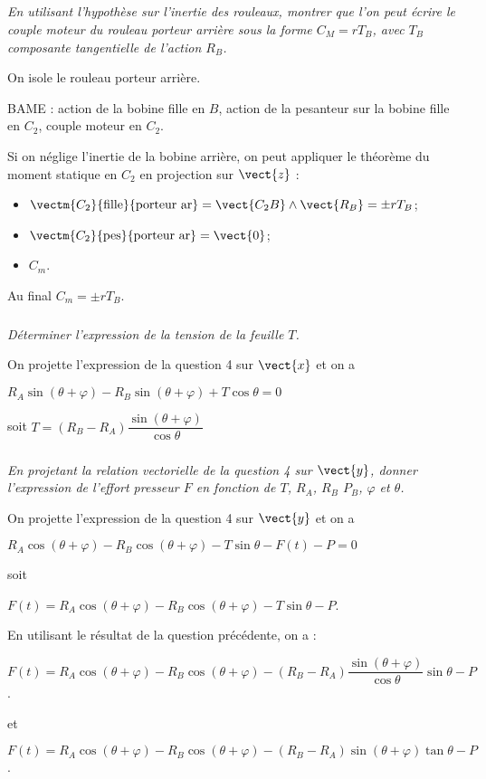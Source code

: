\subparagraph{}
\textit{En utilisant l'hypothèse sur l'inertie des rouleaux, montrer que l'on peut écrire le couple moteur du rouleau porteur arrière sous la forme $C_M=rT_B$, avec $T_B$ composante tangentielle de l'action $R_B$.}
\ifprof
\begin{corrige}
On isole le rouleau porteur arrière.

BAME : action de la bobine fille en $B$, action de la pesanteur sur la bobine fille en $C_2$, couple moteur en $C_2$. 

Si on néglige l'inertie de la bobine arrière, on peut appliquer le théorème du moment statique en $C_2$ en projection sur $\vect{z}$ :
\begin{itemize}
\item $\vectm{C_2}{\text{fille}}{\text{porteur ar}} = \vect{C_2 B} \wedge \vect{R_B} = \pm r T_B$; 
\item $\vectm{C_2}{\text{pes}}{\text{porteur ar}} = \vect{0}$; 
\item $C_m$.
\end{itemize}
Au final $C_m = \pm r T_B$.

\end{corrige}
\else
\fi


\subparagraph{}
\textit{Déterminer l'expression de la tension de la feuille $T$.}
\ifprof
\begin{corrige}
On projette l'expression de la question 4 sur $\vect{x}$ et on a 

$R_A \sin \left(\theta+\varphi\right) - R_B\sin \left(\theta+\varphi\right) + T \cos\theta = 0$

soit
$T =\left(R_B  -R_A\right) \dfrac{\sin \left(\theta+\varphi\right)}{\cos\theta } $
\end{corrige}
\else
\fi


\subparagraph{}
\textit{En projetant la relation vectorielle de la question 4 sur $\vect{y}$, donner l'expression de l'effort presseur $F$ en fonction de $T$, $R_A$, $R_B$ $P_B$, $\varphi$ et $\theta$.}
\ifprof
\begin{corrige}
On projette l'expression de la question 4 sur $\vect{y}$ et on a 

\noindent $R_A \cos \left(\theta+\varphi\right) - R_B\cos \left(\theta+\varphi\right) - T \sin\theta -F(t)-P= 0$ 

soit

$F(t)=R_A \cos \left(\theta+\varphi\right) - R_B\cos \left(\theta+\varphi\right) - T \sin\theta -P$.

En utilisant le résultat de la question précédente, on a : 

$F(t)=R_A \cos \left(\theta+\varphi\right) - R_B\cos \left(\theta+\varphi\right) - \left(R_B  -R_A\right) \dfrac{\sin \left(\theta+\varphi\right)}{\cos\theta } \sin\theta -P$.

et


$F(t)=R_A \cos \left(\theta+\varphi\right) - R_B\cos \left(\theta+\varphi\right) - \left(R_B  -R_A\right)\sin \left(\theta+\varphi\right)  \tan \theta -P$.

\end{corrige}
\else
\fi


